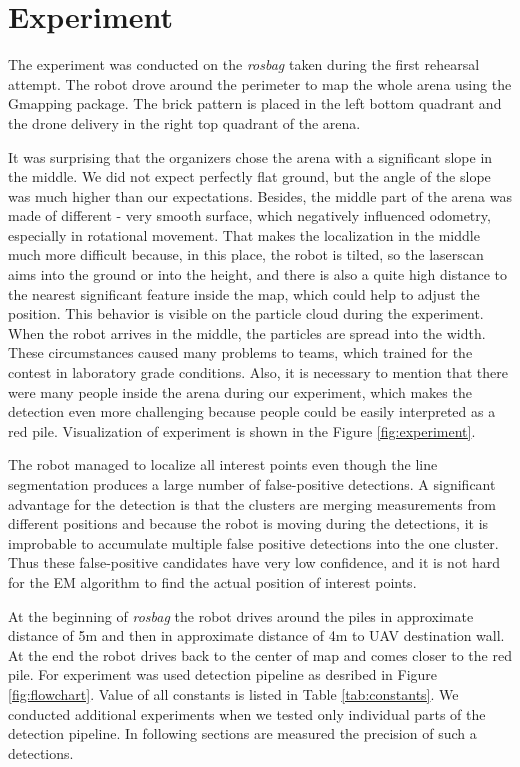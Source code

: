 \chapter{Experiment}
\label{ch:experiment}
The experiment was conducted on the \textit{rosbag} taken during the first rehearsal attempt. The robot drove around the perimeter to map the whole arena using the Gmapping package. The brick pattern is placed in the left bottom quadrant and the drone delivery in the right top quadrant of the arena.

 It was surprising that the organizers chose the arena with a significant slope in the middle. We did not expect perfectly flat ground, but the angle of the slope was much higher than our expectations. Besides, the middle part of the arena was made of different - very smooth surface, which negatively influenced odometry, especially in rotational movement. That makes the localization in the middle much more difficult because, in this place, the robot is tilted, so the laserscan aims into the ground or into the height, and there is also a quite high distance to the nearest significant feature inside the map, which could help to adjust the position. This behavior is visible on the particle cloud during the experiment. When the robot arrives in the middle, the particles are spread into the width. These circumstances caused many problems to teams, which trained for the contest in laboratory grade conditions. Also, it is necessary to mention that there were many people inside the arena during our experiment, which makes the detection even more challenging because people could be easily interpreted as a red pile. Visualization of experiment is shown in the Figure \ref{fig:experiment}.

The robot managed to localize all interest points even though the line segmentation produces a large number of false-positive detections. A significant advantage for the detection is that the clusters are merging measurements from different positions and because the robot is moving during the detections, it is improbable to accumulate multiple false positive detections into the one cluster. Thus these false-positive candidates have very low confidence, and it is not hard for the EM algorithm to find the actual position of interest points. 

At the beginning of \textit{rosbag} the robot drives around the piles in approximate distance of 5m and then in approximate distance of 4m to UAV destination wall. At the end the robot drives back to the center of map and comes closer to the red pile. For experiment was used detection pipeline as desribed in Figure \ref{fig:flowchart}. Value of all constants is listed in Table \ref{tab:constants}. We conducted additional experiments when we tested only individual parts of the detection pipeline. In following sections are measured the precision of such a detections.


